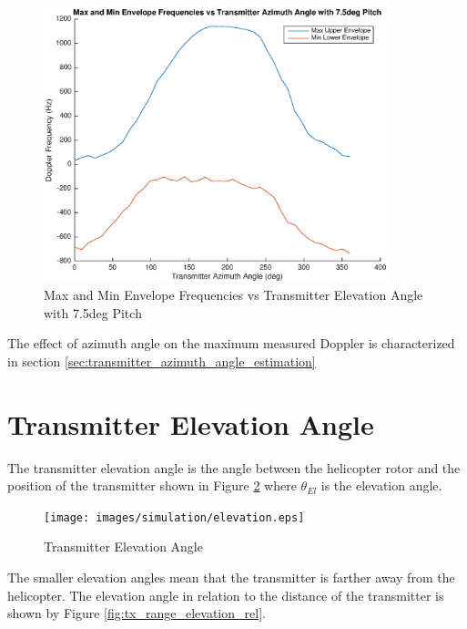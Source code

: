 \begin{figure}
	\begin{center}
		\includegraphics[width=10cm]{images/simulation/pitch_azimuth_rev.eps}
		\caption{Max and Min Envelope Frequencies vs Transmitter Elevation Angle with 7.5deg Pitch}
		\label{fig:pitch_azimuth_rev}
	\end{center}
\end{figure}

The effect of azimuth angle on the maximum measured Doppler is characterized in section \ref{sec:transmitter_azimuth_angle_estimation}

\section{Transmitter Elevation Angle} \label{sec:tea}
The transmitter elevation angle is the angle between the helicopter rotor and the position of the transmitter shown in Figure \ref{fig:azimuth_rel} where $\theta_{El}$ is the elevation angle. 

\begin{figure}
	\begin{center}
		\texttt{[image: images/simulation/elevation.eps]}
		\caption{Transmitter Elevation Angle}
		\label{fig:azimuth_rel}
	\end{center}
\end{figure}

The smaller elevation angles mean that the transmitter is farther away from the helicopter. The elevation angle in relation to the distance of the transmitter is shown by Figure \ref{fig:tx_range_elevation_rel}.

